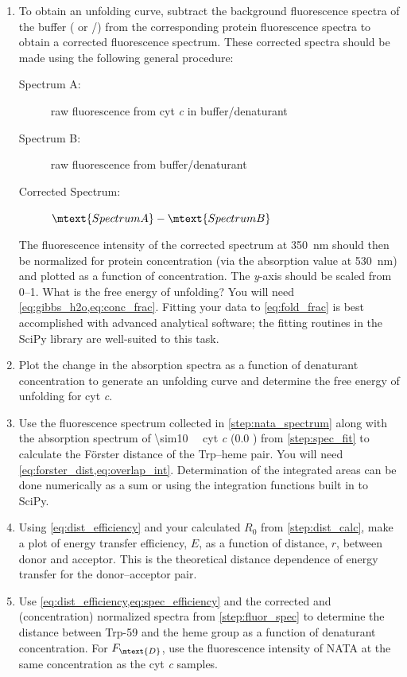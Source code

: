 \begin{enumerate}
	\item To obtain an unfolding curve, subtract the background fluorescence spectra of the buffer ( or /) from the corresponding protein fluorescence spectra to obtain a corrected fluorescence spectrum. 
	These corrected spectra should be made using the following general procedure:
	\begin{description}
		\item [Spectrum A:] raw fluorescence from cyt \emph{c} in buffer/denaturant
		\item [Spectrum B:] raw fluorescence from buffer/denaturant
		\item [Corrected Spectrum:] \( \mtext{Spectrum A} - \mtext{Spectrum B} \)
	\end{description}
	The fluorescence intensity of the corrected spectrum at \qty{350}{\nm} should then be normalized for protein concentration (via the absorption value at \qty{530}{\nm}) and plotted as a function of  concentration. 
	The \emph{y}-axis should be scaled from \numrange{0}{1}. 
	What is the free energy of unfolding?
	You will need \cref{eq:gibbs_h2o,eq:conc_frac}. 
	Fitting your data to \cref{eq:fold_frac} is best accomplished with advanced analytical software; the fitting routines in the SciPy library are well-suited to this task. 
	\label{step:spec_fit}
	\item Plot the change in the absorption spectra as a function of denaturant concentration to generate an unfolding curve and determine the free energy of unfolding for cyt \emph{c}.
	\label{step:abs_fit}
	\item Use the fluorescence spectrum collected in \cref{step:nata_spectrum} along with the absorption spectrum of \qty{\sim10}{\micro\Molar} cyt \emph{c} (\qty{0.0}{\Molar} ) from \cref{step:spec_fit} to calculate the Förster distance of the Trp--heme pair. 
	You will need \cref{eq:forster_dist,eq:overlap_int}.
	Determination of the integrated areas can be done numerically as a sum or using the integration functions built in to SciPy.
	\label{step:dist_calc}
	\item Using \cref{eq:dist_efficiency} and your calculated \( R_0 \) from \cref{step:dist_calc}, make a plot of energy transfer efficiency, \( E \), as a function of distance, \( r \), between donor and acceptor. 
	This is the theoretical distance dependence of energy transfer for the donor--acceptor pair. 
	\item Use \cref{eq:dist_efficiency,eq:spec_efficiency} and the corrected and (concentration) normalized spectra from \cref{step:fluor_spec} to determine the distance between Trp-59 and the heme group as a function of denaturant concentration. 
	For \( F_\mtext{D} \), use the fluorescence intensity of NATA at the same concentration as the cyt \emph{c} samples. 
\end{enumerate}

